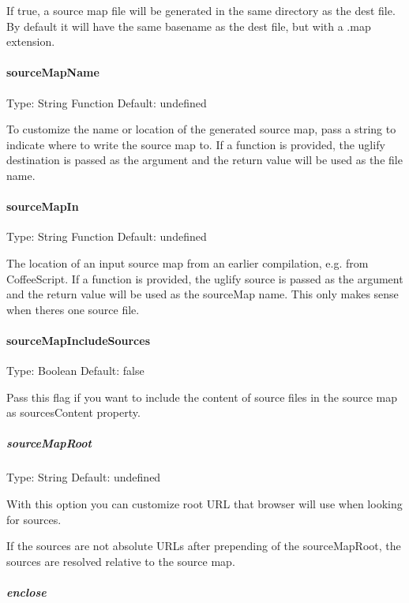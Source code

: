 If {\ttfamily true}, a source map file will be generated in the same directory as the {\ttfamily dest} file. By default it will have the same basename as the {\ttfamily dest} file, but with a {\ttfamily .map} extension.

\paragraph*{source\+Map\+Name}

Type\+: {\ttfamily String} {\ttfamily Function} Default\+: {\ttfamily undefined}

To customize the name or location of the generated source map, pass a string to indicate where to write the source map to. If a function is provided, the uglify destination is passed as the argument and the return value will be used as the file name.

\paragraph*{source\+Map\+In}

Type\+: {\ttfamily String} {\ttfamily Function} Default\+: {\ttfamily undefined}

The location of an input source map from an earlier compilation, e.\+g. from Coffee\+Script. If a function is provided, the uglify source is passed as the argument and the return value will be used as the source\+Map name. This only makes sense when there\textquotesingle{}s one source file.

\paragraph*{source\+Map\+Include\+Sources}

Type\+: {\ttfamily Boolean} Default\+: {\ttfamily false}

Pass this flag if you want to include the content of source files in the source map as sources\+Content property.

\subparagraph*{source\+Map\+Root}

Type\+: {\ttfamily String} Default\+: {\ttfamily undefined}

With this option you can customize root U\+RL that browser will use when looking for sources.

If the sources are not absolute U\+R\+Ls after prepending of the {\ttfamily source\+Map\+Root}, the sources are resolved relative to the source map.

\subparagraph*{enclose}

